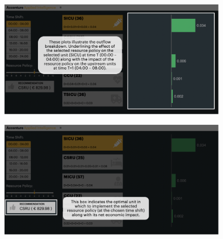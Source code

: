 \documentclass[12pt]{article}
\begin{document}
\begin{figure}[h!]
	\centering
	\includegraphics[scale=0.3]{../outflow-app/screenshots/detail_4.png}
	\label{detail_4}
\end{figure}
\begin{figure}[h!]
	\centering
	\includegraphics[scale=0.3]{../outflow-app/screenshots/detail_5.png}
	\label{detail_5}
\end{figure}
\end{document}
